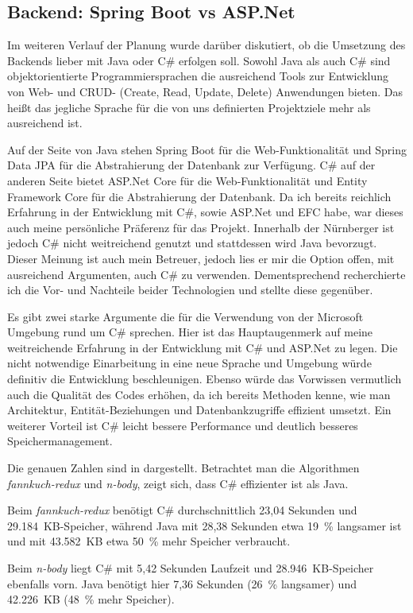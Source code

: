 \subsection{Backend: Spring Boot vs ASP.Net}
Im weiteren Verlauf der Planung wurde darüber diskutiert, ob die Umsetzung des Backends lieber mit Java oder C\# erfolgen soll. 
Sowohl Java als auch C\# sind objektorientierte Programmiersprachen die ausreichend Tools zur Entwicklung von Web- und CRUD- (Create, Read, Update, Delete) Anwendungen bieten.
Das heißt das jegliche Sprache für die von uns definierten Projektziele mehr als ausreichend ist.

Auf der Seite von Java stehen Spring Boot für die Web-Funktionalität und Spring Data JPA für die Abstrahierung der Datenbank zur Verfügung.
C\# auf der anderen Seite bietet ASP.Net Core für die Web-Funktionalität und Entity Framework Core für die Abstrahierung der Datenbank.
Da ich bereits reichlich Erfahrung in der Entwicklung mit C\#, sowie ASP.Net und EFC habe, war dieses auch meine persönliche Präferenz für das Projekt.
Innerhalb der Nürnberger ist jedoch C\# nicht weitreichend genutzt und stattdessen wird Java bevorzugt. Dieser Meinung ist auch mein Betreuer, jedoch lies er mir die Option offen, mit 
ausreichend Argumenten, auch C\# zu verwenden. 
Dementsprechend recherchierte ich die Vor- und Nachteile beider Technologien und stellte diese gegenüber.

Es gibt zwei starke Argumente die für die Verwendung von der Microsoft Umgebung rund um C\# sprechen.
Hier ist das Hauptaugenmerk auf meine weitreichende Erfahrung in der Entwicklung mit C\# und ASP.Net zu legen.
Die nicht notwendige Einarbeitung in eine neue Sprache und Umgebung würde definitiv die Entwicklung beschleunigen.
Ebenso würde das Vorwissen vermutlich auch die Qualität des Codes erhöhen, da ich bereits Methoden kenne, wie man Architektur, Entität-Beziehungen und Datenbankzugriffe effizient umsetzt.
Ein weiterer Vorteil ist C\# leicht bessere Performance und deutlich besseres Speichermanagement. 

Die genauen Zahlen sind in \cite{Debian2025} dargestellt. 
Betrachtet man die Algorithmen \textit{fannkuch-redux} und \textit{n-body}, zeigt sich, dass C\# effizienter ist als Java.

Beim \textit{fannkuch-redux} benötigt C\# durchschnittlich 23,04 Sekunden und 29.184~KB-Speicher, 
während Java mit 28,38 Sekunden etwa 19~\% langsamer ist und mit 43.582~KB etwa 50~\% mehr Speicher verbraucht.

Beim \textit{n-body} liegt C\# mit 5,42 Sekunden Laufzeit und 28.946~KB-Speicher ebenfalls vorn. 
Java benötigt hier 7,36 Sekunden (26~\% langsamer) und 42.226~KB (48~\% mehr Speicher).

